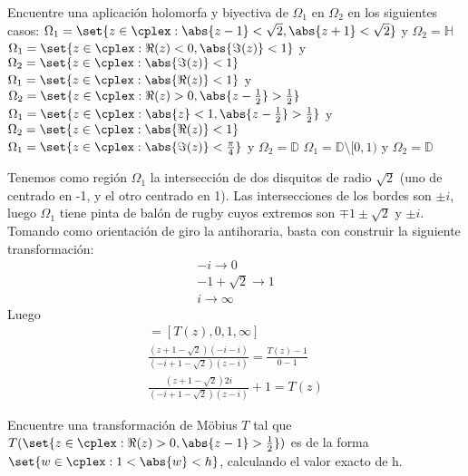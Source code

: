 \begin{problem}
Encuentre una aplicación holomorfa y biyectiva de $\Omega_1$ en $\Omega_2$ en los siguientes casos:
\ppart $\Omega_{1} = \set{z \in \cplex: \abs{z-1} < \sqrt{2}, \abs{z+1} < \sqrt{2}}$ y $\Omega_{2} = \mathbb{H}$
\ppart $\Omega_{1} = \set{z \in \cplex: \Re(z) < 0, \abs{\Im(z)} < 1}$ y $\Omega_{2} = \set{z \in \cplex: \abs{\Im(z)} < 1}$
\ppart $\Omega_{1} = \set{z \in \cplex: \abs{\Re(z)} < 1}$ y $\Omega_{2} = \set{z \in \cplex: \Re(z) > 0, \abs{z - \frac{1}{2}} > \frac{1}{2}}$
\ppart $\Omega_{1} = \set{z \in \cplex: \abs{z} < 1, \abs{z - \frac{1}{2}} > \frac{1}{2}}$ y $\Omega_{2} = \set{z \in \cplex: \abs{\Re(z)} < 1}$
\ppart $\Omega_{1} = \set{z \in \cplex: \abs{\Im(z)} < \frac{\pi}{4}}$ y $\Omega_{2} = \mathbb{D}$
\ppart $\Omega_{1} = \mathbb{D}\setminus[0,1)$ y $\Omega_{2} = \mathbb{D}$
\solution

\spart {}

Tenemos como región $\Omega_1$ la intersección de dos disquitos de radio $\sqrt{2}$ (uno de centrado en -1, y el otro centrado en 1). Las intersecciones de los bordes son $\pm i$, luego $\Omega_1$ tiene pinta de balón de rugby cuyos extremos son $\mp 1 \pm \sqrt{2}$ y $\pm i$. Tomando como orientación de giro la antihoraria, basta con construir la siguiente transformación:
\begin{align*}
	-i \to 0\\
	-1+\sqrt{2} \to 1\\
	i \to \infty
\end{align*}
Luego
\begin{align*}
[z, -i, -1+\sqrt{2}, i] = [T(z), 0, 1, \infty]\\
\frac{(z + 1 - \sqrt{2}) (-i - i)}{(-i + 1 - \sqrt{2}) (z - i)} = \frac{T(z) - 1}{0 - 1}\\
\frac{(z + 1 - \sqrt{2}) 2i}{(-i + 1 - \sqrt{2}) (z - i)} + 1 = T(z)
\end{align*}

\spart

\spart

\spart

\spart

\spart

\end{problem}

\begin{problem}
Encuentre una transformación de Möbius $T$ tal que $T(\set{z \in \cplex: \Re(z) > 0, \abs{z - 1} > \frac{1}{2}})$ es de la forma $\set{w \in \cplex: 1 < \abs{w} < h}$, calculando el valor exacto de h.
\solution

\end{problem}


